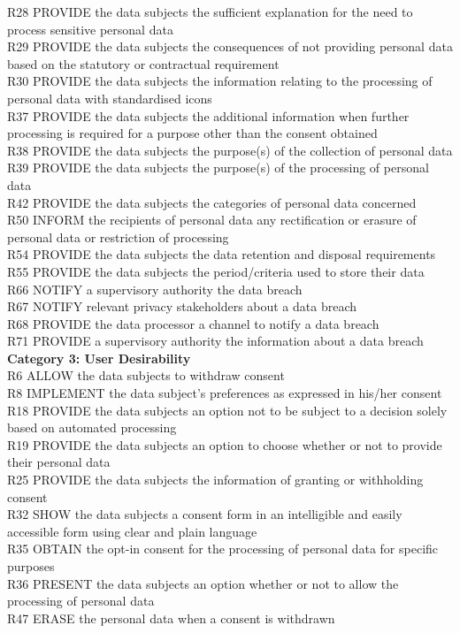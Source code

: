 R28	PROVIDE the data subjects the sufficient explanation for the need to process sensitive personal data \\
R29	PROVIDE the data subjects the consequences of not providing personal data based on the statutory or contractual requirement \\
R30	PROVIDE the data subjects the information relating to the processing of personal data with standardised icons \\
R37 PROVIDE the data subjects the additional information when further processing is required for a purpose other than the consent obtained \\
R38	PROVIDE the data subjects the purpose(s) of the collection of personal data \\
R39	PROVIDE the data subjects the purpose(s) of the processing of personal data \\
R42	PROVIDE the data subjects the categories of personal data concerned \\
R50 INFORM the recipients of personal data any rectification or erasure of personal data or restriction of processing \\				
R54	PROVIDE the data subjects the data retention and disposal requirements \\
R55	PROVIDE the data subjects the period/criteria used to store their data \\
R66	NOTIFY a supervisory authority the data breach \\
R67	NOTIFY relevant privacy stakeholders about a data breach \\
R68	PROVIDE the data processor a channel to notify a data breach \\
R71	PROVIDE a supervisory authority the information about a data breach \\

\noindent \textbf{Category 3: User Desirability}\\
R6 ALLOW the data subjects to withdraw consent \\
R8 IMPLEMENT the data subject's preferences as expressed in his/her consent \\
R18 PROVIDE the data subjects an option not to be subject to a decision solely based on automated processing \\
R19 PROVIDE the data subjects an option to choose whether or not to provide their personal data \\
R25 PROVIDE the data subjects the information of granting or withholding consent \\
R32 SHOW the data subjects a consent form in an intelligible and easily accessible form using clear and plain language \\
R35 OBTAIN the opt-in consent for the processing of personal data for specific purposes \\
R36 PRESENT the data subjects an option whether or not to allow the processing of personal data \\
R47 ERASE the personal data when a consent is withdrawn \\

